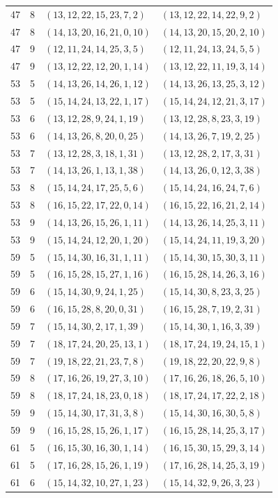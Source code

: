 \begin{longtable}{rrll}
47&8&$(13,12,22,15,23,7,2)$&$(13,12,22,14,22,9,2)$\\
47&8&$(14,13,20,16,21,0,10)$&$(14,13,20,15,20,2,10)$\\
47&9&$(12,11,24,14,25,3,5)$&$(12,11,24,13,24,5,5)$\\
47&9&$(13,12,22,12,20,1,14)$&$(13,12,22,11,19,3,14)$\\
53&5&$(14,13,26,14,26,1,12)$&$(14,13,26,13,25,3,12)$\\
53&5&$(15,14,24,13,22,1,17)$&$(15,14,24,12,21,3,17)$\\
53&6&$(13,12,28,9,24,1,19)$&$(13,12,28,8,23,3,19)$\\
53&6&$(14,13,26,8,20,0,25)$&$(14,13,26,7,19,2,25)$\\
53&7&$(13,12,28,3,18,1,31)$&$(13,12,28,2,17,3,31)$\\
53&7&$(14,13,26,1,13,1,38)$&$(14,13,26,0,12,3,38)$\\
53&8&$(15,14,24,17,25,5,6)$&$(15,14,24,16,24,7,6)$\\
53&8&$(16,15,22,17,22,0,14)$&$(16,15,22,16,21,2,14)$\\
53&9&$(14,13,26,15,26,1,11)$&$(14,13,26,14,25,3,11)$\\
53&9&$(15,14,24,12,20,1,20)$&$(15,14,24,11,19,3,20)$\\
59&5&$(15,14,30,16,31,1,11)$&$(15,14,30,15,30,3,11)$\\
59&5&$(16,15,28,15,27,1,16)$&$(16,15,28,14,26,3,16)$\\
59&6&$(15,14,30,9,24,1,25)$&$(15,14,30,8,23,3,25)$\\
59&6&$(16,15,28,8,20,0,31)$&$(16,15,28,7,19,2,31)$\\
59&7&$(15,14,30,2,17,1,39)$&$(15,14,30,1,16,3,39)$\\
59&7&$(18,17,24,20,25,13,1)$&$(18,17,24,19,24,15,1)$\\
59&7&$(19,18,22,21,23,7,8)$&$(19,18,22,20,22,9,8)$\\
59&8&$(17,16,26,19,27,3,10)$&$(17,16,26,18,26,5,10)$\\
59&8&$(18,17,24,18,23,0,18)$&$(18,17,24,17,22,2,18)$\\
59&9&$(15,14,30,17,31,3,8)$&$(15,14,30,16,30,5,8)$\\
59&9&$(16,15,28,15,26,1,17)$&$(16,15,28,14,25,3,17)$\\
61&5&$(16,15,30,16,30,1,14)$&$(16,15,30,15,29,3,14)$\\
61&5&$(17,16,28,15,26,1,19)$&$(17,16,28,14,25,3,19)$\\
61&6&$(15,14,32,10,27,1,23)$&$(15,14,32,9,26,3,23)$\\

\end{longtable}
